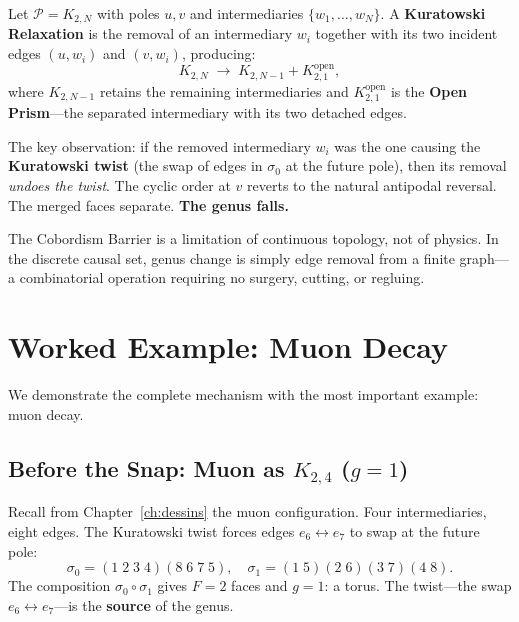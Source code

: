 \documentclass[11pt, a4paper, openany]{book}
\begin{document}
\begin{definition}\label{def:relaxation}
Let $\mathcal{P} = K_{2,N}$ with poles $u, v$ and intermediaries
$\{w_1, \ldots, w_N\}$. A \textbf{Kuratowski Relaxation} is the
removal of an intermediary $w_i$ together with its two incident edges
$(u, w_i)$ and $(v, w_i)$, producing:
\[
  K_{2,N} \;\longrightarrow\; K_{2,N-1} + K_{2,1}^{\mathrm{open}},
\]
where $K_{2,N-1}$ retains the remaining intermediaries and
$K_{2,1}^{\mathrm{open}}$ is the \textbf{Open Prism}---the separated
intermediary with its two detached edges.
\end{definition}

\noindent
The key observation: if the removed intermediary $w_i$ was the one
causing the \textbf{Kuratowski twist} (the swap of edges in
$\sigma_0$ at the future pole), then its removal \emph{undoes the
twist}. The cyclic order at $v$ reverts to the natural antipodal
reversal. The merged faces separate. \textbf{The genus falls.}

\begin{result}[title={Cobordism is a continuum artefact}]
The Cobordism Barrier is a limitation of continuous topology, not of
physics. In the discrete causal set, genus change is simply edge
removal from a finite graph---a combinatorial operation requiring no
surgery, cutting, or regluing.
\end{result}

\section{Worked Example: Muon Decay}\label{sec:muon-decay}

We demonstrate the complete mechanism with the most important example:
muon decay.

\subsection{Before the Snap: Muon as $K_{2,4}$ ($g = 1$)}

Recall from Chapter~\ref{ch:dessins} the muon configuration. Four
intermediaries, eight edges. The Kuratowski twist forces edges
$e_6 \leftrightarrow e_7$ to swap at the future pole:
\[
  \sigma_0 = (1\;2\;3\;4)(8\;6\;7\;5), \quad
  \sigma_1 = (1\;5)(2\;6)(3\;7)(4\;8).
\]
The composition $\sigma_0 \circ \sigma_1$ gives $F = 2$ faces and
$g = 1$: a torus. The twist---the swap $e_6 \leftrightarrow e_7$---is
the \textbf{source} of the genus.
\end{document}
